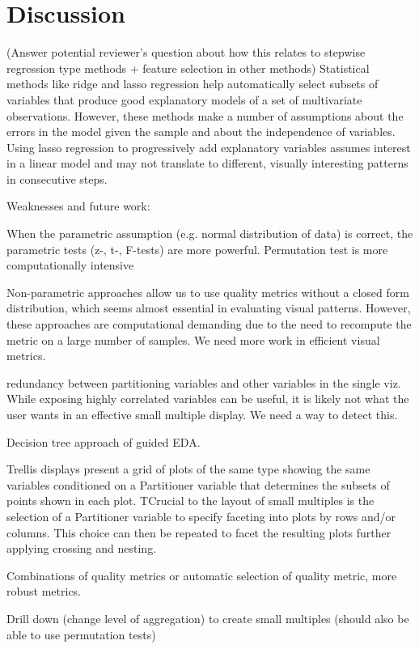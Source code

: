 \section{Discussion}
\label{sec:discussion}
(Answer potential reviewer's question about how this relates to stepwise regression type methods + feature selection in other methods)
Statistical methods like ridge and lasso regression help automatically select subsets of variables that produce good explanatory models of a set of multivariate observations. However, these methods make a number of assumptions about the errors in the model given the sample and about the independence of  variables. Using lasso regression to progressively add explanatory variables assumes interest in a linear model and may not translate to different, visually interesting  patterns in consecutive steps.

Weaknesses and future work:

When the parametric assumption (e.g. normal distribution of data) is correct, the parametric tests (z-, t-, F-tests) are more powerful.
Permutation test is more computationally intensive

Non-parametric approaches allow us to use quality metrics without a closed form distribution, which seems almost essential in evaluating visual patterns. However, these approaches are computational demanding due to the need to recompute the metric on a large number of samples. We need more work in efficient visual metrics.

redundancy between partitioning variables and other variables in the single viz. While exposing highly correlated variables can be useful, it is likely not what the user wants in an effective small multiple display. We need a way to detect this.

Decision tree approach of guided EDA.

Trellis displays present a grid of plots of the same type showing the same variables conditioned on a Partitioner variable that determines the subsets of points shown in each plot. TCrucial to the layout of small multiples is the selection of a Partitioner variable to specify faceting into plots by rows and/or columns. This choice can then be repeated to facet the resulting plots further applying crossing and nesting.

Combinations of quality metrics or automatic selection of quality metric, more robust metrics.

Drill down (change level of aggregation) to create small multiples (should also be able to use permutation tests)


